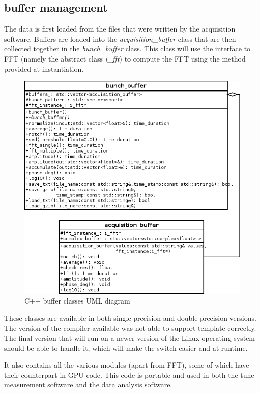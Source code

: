 \subsection{buffer management}

The data is first loaded from the files that were written by the
acquisition software. Buffers are loaded into the
\emph{acquisition\_buffer} class that are then collected together in
the \emph{bunch\_buffer} class. This class will use the interface to
\gls{FFT} (namely the abstract class \emph{i\_fft}) to compute the
\gls{FFT} using the method provided at instantiation.

\begin{figure}[H]
\centering
\caption{C++ buffer classes UML diagram}
\includegraphics[scale=0.5]{buffer_uml.png}
\end{figure}

These classes are available in both single precision and double
precision versions. The version of the compiler available was not able
to support template correctly. The final version that will run on a
newer version of the Linux operating system should be able to handle
it, which will make the switch easier and at runtime.

It also contains all the various modules (apart from \gls{FFT}), some of which have their counterpart in \gls{GPU} code. This code is portable and used in both the tune measurement software and the data analysis software.

